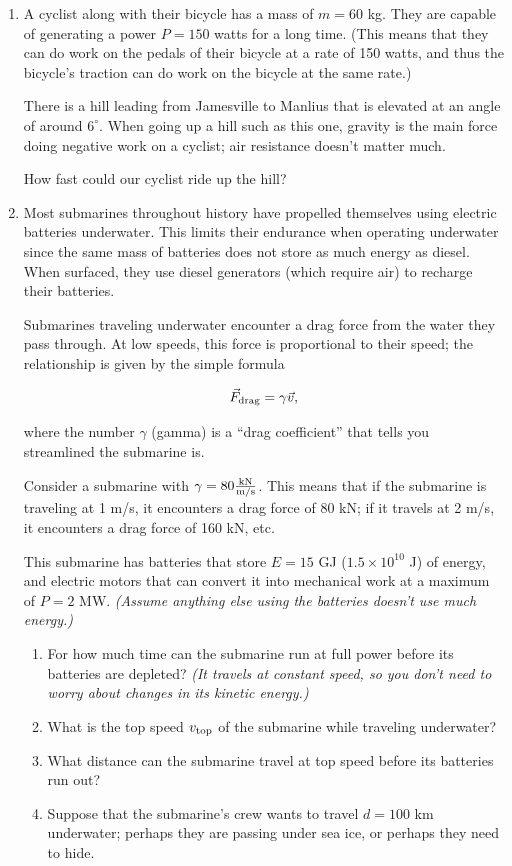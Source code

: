 \documentclass[12pt]{article}
\begin{document}
\begin{enumerate}
\begin{enumerate}
\end{enumerate}


\bigskip

\item A cyclist along with their bicycle has a mass of $m=60$ kg. They are capable of generating a power $P=150$ watts for a long time. (This means that they can do work on the pedals of their bicycle at a rate of 150 watts, and thus the bicycle's traction can do work on the bicycle at the same rate.)

There is a hill leading from Jamesville to Manlius that is elevated at an angle of around $6^\circ$. When going up a hill such as this one, gravity is the main force doing negative work on a cyclist; air resistance doesn't matter much.

How fast could our cyclist ride up the hill?


\bigskip\newpage

\item Most submarines throughout history have propelled themselves using electric batteries underwater. This limits their endurance when operating underwater since the same mass of batteries does not store as much energy as diesel. When surfaced, they use diesel generators (which require air) to recharge their batteries. 

Submarines traveling underwater encounter a drag force from the water they pass through. At low speeds, this force is proportional to their speed; the relationship is given by the simple formula

$$\vec F_{\rm {drag}} = \gamma \vec v,$$

where the number $\gamma$ (gamma) is a ``drag coefficient'' that tells you streamlined the submarine is.

Consider a submarine with $\gamma = 80 \frac{\text{kN}}{\rm m/\rm s}$. This means that if the submarine is traveling at 1 m/s, it encounters a drag force of 80 kN; if it travels at 2 m/s, it encounters a drag force of 160 kN, etc. 

This submarine has batteries that store $E=15$ GJ ($1.5 \times 10^{10}$ J) of energy, and electric motors that can convert it into mechanical work at a maximum of $P=2$ MW. {\it (Assume anything else using the batteries doesn't use much energy.)}

\begin{enumerate}
	\item For how much time can the submarine run at full power before its batteries are depleted? {\it (It travels at constant speed, so you don't need to worry about changes in its kinetic energy.)}
	\item What is the top speed $v_{\rm top}$ of the submarine while traveling underwater?
	\item What distance can the submarine travel at top speed before its batteries run out?
	\item  Suppose that the submarine's crew wants to travel $d=100$ km underwater; perhaps they are passing under sea ice, or perhaps they need to hide.
	

\end{enumerate}
\end{enumerate}
\end{document}

